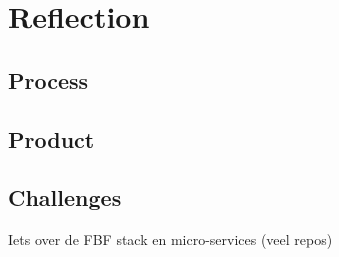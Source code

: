 \chapter{Reflection}

\section{Process}

\section{Product}

\section{Challenges}
Iets over de FBF stack en micro-services (veel repos)
